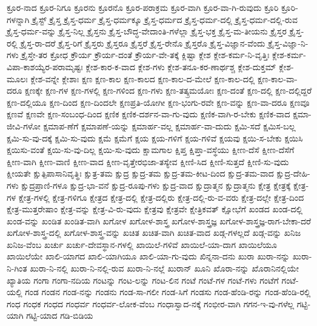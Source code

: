 {ಕ್ರೂರ-ನಾದ
ಕ್ರೂರ-ನಿಗೂ
ಕ್ರೂರನು
ಕ್ರೂರನೊ
ಕ್ರೂರ-ಪರಾಕ್ರಮ
ಕ್ರೂರ-ವಾಗಿ
ಕ್ರೂರ-ವಾ-ಗಿ-ರುವುದು
ಕ್ರೂರಿ
ಕ್ರೂರಿ-ಗಳನ್ನಾಗಿ
ಕ್ರೈಸ್ಟ್
ಕ್ರೈಸ್ತ
ಕ್ರೈಸ್ತ-ಧರ್ಮ
ಕ್ರೈಸ್ತ-ಧರ್ಮಕ್ಕೂ
ಕ್ರೈಸ್ತ-ಧರ್ಮದ
ಕ್ರೈಸ್ತ-ಧರ್ಮ-ದಲ್ಲಿ
ಕ್ರೈಸ್ತ-ಧರ್ಮ-ದಲ್ಲಿ-ರುವ
ಕ್ರೈಸ್ತ-ಧರ್ಮ-ವನ್ನು
ಕ್ರೈಸ್ತ-ನಿಲ್ಲ
ಕ್ರೈಸ್ತನು
ಕ್ರೈಸ್ತ-ಬೌದ್ಧ-ವೇದಾಂತಿ-ಗಳೆಲ್ಲಾ
ಕ್ರೈಸ್ತ-ಭಕ್ತ
ಕ್ರೈಸ್ತ-ಮ-ತೀಯನು
ಕ್ರೈಸ್ತರ
ಕ್ರೈಸ್ತ-ರಲ್ಲಿ
ಕ್ರೈಸ್ತ-ರಾ-ದರೆ
ಕ್ರೈಸ್ತ-ರಿಗೆ
ಕ್ರೈಸ್ತರು
ಕ್ರೈಸ್ತರೂ
ಕ್ರೈಸ್ತರೆ
ಕ್ರೈಸ್ತ-ರೇನೊ
ಕ್ರೈಸ್ತರೊ
ಕ್ರೈಸ್ತ-ವಿಜ್ಞಾನ-ವೆಂದು
ಕ್ರೈಸ್ತ-ವಿಜ್ಞಾ-ನಿ-ಗಳು
ಕ್ರೈಸ್ತೇ-ತರ
ಕ್ರೋಧ
ಕ್ರೌರ್ಯ
ಕ್ರೌರ್ಯ-ದಂತೆ
ಕ್ರೌರ್ಯ-ವೇ-ತಕ್ಕೆ
ಕ್ಲಿಷ್ಟಾ
ಕ್ಲೇಶ
ಕ್ಲೇಶ-ಕರ್ಮ-ನಿ-ವೃತ್ತಿಃ
ಕ್ಲೇಶ-ಕರ್ಮ-ವಿಪಾ-ಕಾಶಯ್ಯೆರ-ಪರಾಮೃಷ್ಟಃ
ಕ್ಲೇಶ-ಕಾರ-ಕ-ವಾದ
ಕ್ಲೇಶ-ಗಳು
ಕ್ಲೇಶ-ತನೂ-ಕರ-ಣಾರ್ಥಶ್ಚ
ಕ್ಲೇಶ-ದುಕ್ತಮ್
ಕ್ಲೇಶ-ಮೂಲಃ
ಕ್ಲೇಶ-ವನ್ನೇ
ಕ್ಲೇಶಾಃ
ಕ್ಷಣ
ಕ್ಷಣ-ಕಾಲ
ಕ್ಷಣ-ಕಾಲದ
ಕ್ಷಣ-ಕಾಲ-ದ-ಮೇಲೆ
ಕ್ಷಣ-ಕಾಲ-ದಲ್ಲಿ
ಕ್ಷಣ-ಕಾಲ-ವಾ-ದರೂ
ಕ್ಷಣಕ್ಕೇ
ಕ್ಷಣ-ಗಳ
ಕ್ಷಣ-ಗಳಲ್ಲಿ
ಕ್ಷಣ-ಗಳಿಂದ
ಕ್ಷಣ-ಗಳು
ಕ್ಷಣ-ತತ್ಕ್ರಮಯೋಃ
ಕ್ಷಣ-ದಂತೆ
ಕ್ಷಣ-ದಲ್ಲಿ
ಕ್ಷಣ-ದಲ್ಲಿದ್ದರೆ
ಕ್ಷಣ-ದಲ್ಲಿಯೂ
ಕ್ಷಣ-ದಿಂದ
ಕ್ಷಣ-ದಿಂದಲೇ
ಕ್ಷಣಪ್ರತಿ-ಯೋಗೀ
ಕ್ಷಣ-ಭಂಗು-ರವೇ
ಕ್ಷಣ-ವನ್ನು
ಕ್ಷಣ-ವಾ-ದರೂ
ಕ್ಷಣವೂ
ಕ್ಷಣವೆ
ಕ್ಷಣವೇ
ಕ್ಷಣ-ಸಂಬಂಧ-ದಿಂದ
ಕ್ಷಣಿಕ
ಕ್ಷಣಿಕ-ದರ್ಶನ-ವಾ-ಗು-ವುದು
ಕ್ಷಣಿಕ-ವಾಗಿ-ರ-ಬೇಕು
ಕ್ಷಣಿಕ-ವಾದ
ಕ್ಷಮಾ-ಜೀವಿ-ಗಳೋ
ಕ್ಷಮಾಪ-ಣೆಗೆ
ಕ್ಷಮಾಪಣೆ-ಯನ್ನು
ಕ್ಷಮಾರ್ಹ-ವಲ್ಲ
ಕ್ಷಮಾರ್ಹ-ವಾ-ದುದು
ಕ್ಷಮಿ-ಸದೆ
ಕ್ಷಮಿಸ-ಬಲ್ಲ
ಕ್ಷಮಿ-ಸು-ವು-ದಕ್ಕೆ
ಕ್ಷಮಿ-ಸು-ವುದು
ಕ್ಷಮೆ
ಕ್ಷಮೆಗೆ
ಕ್ಷಯ
ಕ್ಷಯ-ಗಳಿಗೆ
ಕ್ಷಯ-ಗಳಿವೆ
ಕ್ಷಯವು
ಕ್ಷಯಿ-ಸ-ಬೇಕು
ಕ್ಷಯಿಸಿ
ಕ್ಷಯಿಸು-ವಂತೆ
ಕ್ಷಯಿ-ಸು-ವು-ದಿಲ್ಲ
ಕ್ಷಯಿ-ಸು-ವುದು
ಕ್ಷಾಮಗಾಲ
ಕ್ಷಿಪ್ತ
ಕ್ಷಿಪ್ತಾ-ವಸ್ಥೆಯು
ಕ್ಷೀಣ-ದೆಸೆ
ಕ್ಷೀಣ-ದೆಸೆಗೆ
ಕ್ಷೀಣ-ವಾಗಿ
ಕ್ಷೀಣ-ವಾಣಿ
ಕ್ಷೀಣ-ವಾದ
ಕ್ಷೀಣ-ವೃತ್ತೇರಭಿಜಾ-ತಸ್ಯೇವ
ಕ್ಷೀಣಿ-ಸಿದ
ಕ್ಷೀಣಿ-ಸುತ್ತದೆ
ಕ್ಷೀಣಿ-ಸು-ವುದು
ಕ್ಷೀಯತೇ
ಕ್ಷುತ್ಪಿಪಾಸಾನಿವೃತ್ಥಿಃ
ಕ್ಷುತ್ರ-ತಮ
ಕ್ಷುದ್ರ
ಕ್ಷುದ್ರ-ತಮ
ಕ್ಷುದ್ರ-ತಮ-ಕೀಟ-ದಿಂದ
ಕ್ಷುದ್ರ-ತಮ-ವಾದ
ಕ್ಷುದ್ರ-ದೇಹಿ-ಗಳು
ಕ್ಷುದ್ರಪ್ರಾಣಿ-ಗಳೂ
ಕ್ಷುದ್ರ-ಭಾ-ವನೆ
ಕ್ಷುದ್ರ-ರೂಪು-ಗಳು
ಕ್ಷುದ್ರ-ವಾದ
ಕ್ಷುದ್ರಾತ್ಮನ
ಕ್ಷುದ್ರಾತ್ಮನು
ಕ್ಷೇತ್ರ
ಕ್ಷೇತ್ರಕ್ಕೆ
ಕ್ಷೇತ್ರ-ಗಳ
ಕ್ಷೇತ್ರ-ಗಳಲ್ಲಿ
ಕ್ಷೇತ್ರ-ಗಳಿಗೂ
ಕ್ಷೇತ್ರದ
ಕ್ಷೇತ್ರ-ದಲ್ಲಿ
ಕ್ಷೇತ್ರ-ದಲ್ಲಿರು
ಕ್ಷೇತ್ರ-ದಲ್ಲಿ-ರು-ವ-ವರು
ಕ್ಷೇತ್ರ-ದಲ್ಲೇ
ಕ್ಷೇತ್ರ-ದಿಂದ
ಕ್ಷೇತ್ರ-ಮುತ್ತರೇಷಾಂ
ಕ್ಷೇತ್ರ-ವನ್ನು
ಕ್ಷೇತ್ರ-ವಿ-ರು-ವುದು
ಕ್ಷೇತ್ರವು
ಕ್ಷೇತ್ರವೇ
ಕ್ಷೇತ್ರಿಕವತ್
ಕ್ಷೋಭೆಗೆ
ಖಂಡದ
ಖಂಡ-ದಲ್ಲಿ
ಖಂಡ-ವನ್ನು
ಖಂಡಿತ
ಖಂಡಿತ-ವಾಗಿ
ಖಗೋಳ
ಖಗೋಳ-ಶಾಸ್ತ್ರ
ಖಗೋಳ-ಶಾಸ್ತ್ರಜ್ಞ
ಖಗೋಳ-ಶಾಸ್ತ್ರಜ್ಞ-ರಾಗ-ಬೇಕಾ-ದರೆ
ಖಗೋಳ-ಶಾಸ್ತ್ರ-ದಲ್ಲಿ
ಖಗೋಳ-ಶಾಸ್ತ್ರ-ವನ್ನು
ಖಚಿತ
ಖಚಿತ-ವಾಗಿ
ಖಚಿತ-ವಾದ
ಖಡ್ಗ-ಗಳಲ್ಲದೆ
ಖಡ್ಗ-ವನ್ನು
ಖನಿಜ
ಖನಿಜ-ವೆಂಬ
ಖರ್ಚು
ಖರ್ಚು-ದೇವಸ್ಥಾನ-ಗಳಲ್ಲಿ
ಖಾಯಿಲೆ-ಗಳಿವೆ
ಖಾಯಿಲೆ-ಯಾ-ದಾಗ
ಖಾಯಿಲೆಯೂ
ಖಾಯಿಲೆಯೇ
ಖಾಲಿ-ಯಾಗದ
ಖಾಲಿ-ಯಾಗಿಯೂ
ಖಾಲಿ-ಯಾ-ಗು-ವುದು
ಖಿನ್ನನಾ-ದನು
ಖುರಾ
ಖುರಾ-ನನ್ನು
ಖುರಾ-ನಿ-ಗಿಂತ
ಖುರಾ-ನಿ-ನಲ್ಲಿ
ಖುರಾ-ನಿ-ನಲ್ಲಿ-ರುವ
ಖುರಾ-ನಿ-ನಲ್ಲೆ
ಖುರಾನ್
ಖೂನಿ
ಖೊರಾ-ನನ್ನು
ಖೊರಾನಿನಲ್ಲಿಯೇ
ಖ್ಯಾತಿಯ
ಗಂಗಾ
ಗಂಗಾ-ನದಿಯ
ಗಂಟನ್ನು
ಗಂಟ-ಲನ್ನು
ಗಂಟ-ಲಿನ
ಗಂಟೆ
ಗಂಟೆ-ಗಳ
ಗಂಟೆ-ಗಳು
ಗಂಟೆಗೆ
ಗಂಟೆ-ಯಲ್ಲಿ
ಗಂಡ
ಗಂಡನ
ಗಂಡ-ನನ್ನು
ಗಂಡನು
ಗಂಡ-ಸಾ-ಗಲೀ
ಗಂಡ-ಸಿಗೆ
ಗಂಡಸು
ಗಂಡ-ಹೆಂಡಿ-ರನ್ನು
ಗಂಡ-ಹೆಂಡಿ-ರಲ್ಲಿ
ಗಂಧ
ಗಂಧಕ
ಗಂಧದ
ಗಂಧರ್ವ
ಗಂಧರ್ವ-ಲೋಕ-ವೆಂಬ
ಗಂಧಾಸ್ವಾದ-ನಕ್ಕೆ
ಗಂಭೀರ-ವಾಗಿ
ಗಗನ-ಇ-ವು-ಗಳೆಲ್ಲ
ಗಟ್ಟಿ-ಯಾಗಿ
ಗಟ್ಟಿ-ಯಾದ
ಗಡಿ-ಬಿಡಿಯ
}
